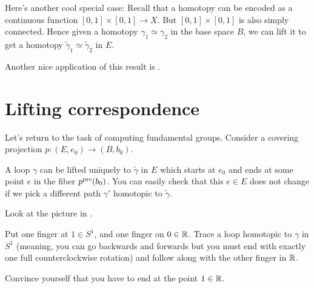 \begin{remark}
	Here's another cool special case:
	Recall that a homotopy can be encoded as a continuous function $[0,1] \times [0,1] \to X$.
	But $[0,1] \times [0,1]$ is also simply connected.
	Hence given a homotopy $\gamma_1 \simeq \gamma_2$ in the base space $B$, we can lift it to get
 a homotopy $\tilde\gamma_1 \simeq \tilde\gamma_2$ in $E$.
\end{remark}
Another nice application of this result is .

\section{Lifting correspondence}
Let's return to the task of computing fundamental groups.
Consider a covering projection $p : (E, e_0) \to (B, b_0)$.

A loop $\gamma$ can be lifted uniquely to $\tilde\gamma$ in $E$
which starts at $e_0$ and ends at some point $e$ in the fiber $p^{\text{pre}}(b_0)$.
You can easily check that this $e \in E$ does not change if we
pick a different path $\gamma'$ homotopic to $\tilde\gamma$.
\begin{ques}
	Look at the picture in .

	Put one finger at $1 \in S^1$, and one finger on $0 \in \mathbb R$.
	Trace a loop homotopic to $\gamma$ in $S^1$ (meaning, you can
	go backwards and forwards but you must end with exactly one full
	counterclockwise rotation)
	and follow along with the other finger in $\mathbb R$.

	Convince yourself that you have to end at the point $1 \in \mathbb R$.
\end{ques}

